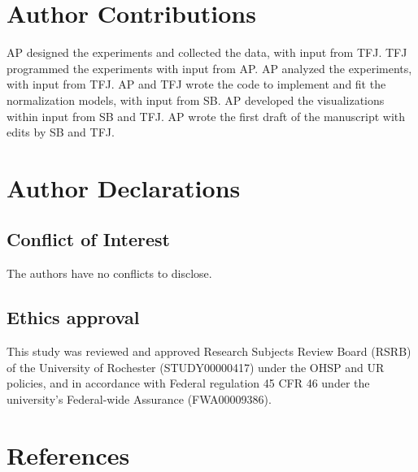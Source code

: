 \documentclass[preprint]{JASA}
\begin{document}
\section*{Author Contributions}\label{author-contributions}

AP designed the experiments and collected the data, with input from TFJ. TFJ programmed the experiments with input from AP. AP analyzed the experiments, with input from TFJ. AP and TFJ wrote the code to implement and fit the normalization models, with input from SB. AP developed the visualizations within input from SB and TFJ. AP wrote the first draft of the manuscript with edits by SB and TFJ.

\section*{Author Declarations}\label{author-declarations}

\subsection*{Conflict of Interest}\label{conflict-of-interest}

The authors have no conflicts to disclose.

\subsection*{Ethics approval}\label{ethics-approval}

This study was reviewed and approved Research Subjects Review Board (RSRB) of the University of Rochester (STUDY00000417) under the OHSP and UR policies, and in accordance with Federal regulation 45 CFR 46 under the university's Federal-wide Assurance (FWA00009386).

\newpage{}

\section{References}\label{sec:references}

\begingroup
\setlength{\parindent}{-0.5in}
\setlength{\leftskip}{0.5in}

\nocite{balzano1982}
\nocite{barreda-nearey2018}
\nocite{goldinger1996}
\nocite{hay2017}
\nocite{hay2019}
\nocite{johnson1999}
\nocite{kleinschmidt-jaeger2016}
\nocite{mcgowan2015}
\nocite{shankweiler1978}
\nocite{shannon1948}
\nocite{strange-jenkins2012}
\nocite{sumner2011}
\nocite{walker-hay2011}
\nocite{zwicker1957}
\nocite{zwicker-terhardt1980}
\end{document}
